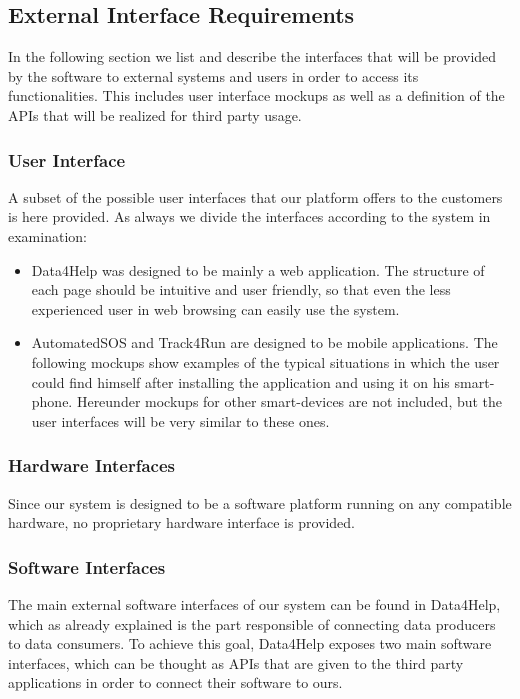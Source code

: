 \subsection{External Interface Requirements}
In the following section we list and describe the interfaces that will be provided by the software to external systems and users in order to access its functionalities. This includes user interface mockups as well as a definition of the APIs that will be realized for third party usage.

\subsubsection{User Interface}
A subset of the possible user interfaces that our platform offers to the customers is here provided. As always we divide the interfaces according to the system in examination:

\begin{itemize}
	\item Data4Help was designed to be mainly a web application. The structure of each page should be intuitive and user friendly, so that even the less experienced user in web browsing can easily use the system.
	\item AutomatedSOS and Track4Run are designed to be mobile applications. The following mockups show examples of the typical situations in which the user could find himself after installing the application and using it on his smart-phone. Hereunder mockups for other smart-devices are not included, but the user interfaces will be very similar to these ones. 
\end{itemize}

\subsubsection{Hardware Interfaces}
Since our system is designed to be a software platform running on any compatible hardware, no proprietary hardware interface is provided.

\subsubsection{Software Interfaces}
The main external software interfaces of our system can be found in Data4Help, which as already explained is the part responsible of connecting data producers to data consumers.
To achieve this goal, Data4Help exposes two main software interfaces, which can be thought as APIs that are given to the third party applications in order to connect their software to ours.


